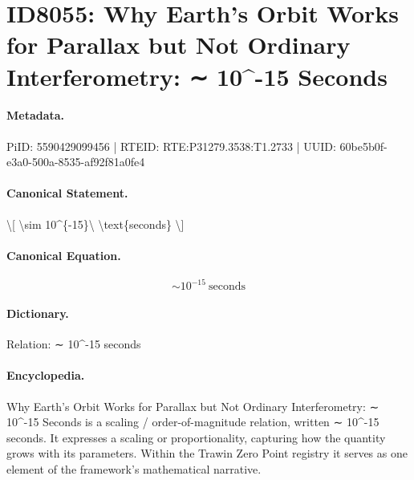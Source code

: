 \section*{ID8055: Why Earth’s Orbit Works for Parallax but Not Ordinary Interferometry: ∼ 10\textasciicircum{}-15 Seconds}
\paragraph{Metadata.}
PiID: 5590429099456 | RTEID: RTE:P31279.3538:T1.2733 | UUID: 60be5b0f-e3a0-500a-8535-af92f81a0fe4

\paragraph{Canonical Statement.}
\textbackslash{}[ \textbackslash{}sim 10\textasciicircum{}\{-15\}\textbackslash{} \textbackslash{}text\{seconds\} \textbackslash{}]

\paragraph{Canonical Equation.}
\[
\sim 10^{-15}\ \text{seconds}
\]

\paragraph{Dictionary.}
Relation: ∼ 10\textasciicircum{}-15 seconds

\paragraph{Encyclopedia.}
Why Earth’s Orbit Works for Parallax but Not Ordinary Interferometry: ∼ 10\textasciicircum{}-15 Seconds is a scaling / order-of-magnitude relation, written ∼ 10\textasciicircum{}-15 seconds. It expresses a scaling or proportionality, capturing how the quantity grows with its parameters. Within the Trawin Zero Point registry it serves as one element of the framework's mathematical narrative.
